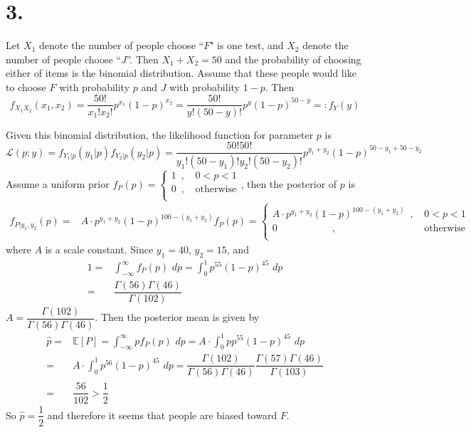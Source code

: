 \documentclass[a4paper,12pt,titlepage]{article}
\begin{document}
\section*{3.}
Let $X_1$ denote the number of people choose ``$F$" is one test, and $X_2$ denote the number of people choose ``$J$''. Then $X_1+X_2=50$ and the probability of choosing either of items is the binomial distribution.  Assume that these people would like to choose $F$ with probability $p$ and $J$ with probability $1-p$. Then
$$f_{X_1X_2}(x_1, x_2)=\dfrac{50!}{x_1!x_2!}p^{x_1}(1-p)^{x_2}=\dfrac{50!}{y!(50-y)!}p^y(1-p)^{50-y}=:f_Y(y)$$

Given this binomial distribution, the likelihood function for parameter $p$ is
$$\mathcal{L}(p;y)=f_{Y_1|p}(y_1|p)f_{Y_2|p}(y_2|p)=\dfrac{50!50!}{y_1!(50-y_1)!y_2!(50-y_2)!}p^{y_1+y_2}(1-p)^{50-y_1+50-y_2}$$
Assume a uniform prior $f_P(p)=\left\{
\begin{aligned}
1\,\,\,,\,&0<p<1\\
0\,\,\,,\,&\text{otherwise}\\
\end{aligned}
\right.$, then the posterior of $p$ is
\begin{align*}
    f_{P|y_1,y_2}(p)=&A\cdot p^{y_1+y_2}(1-p)^{100-(y_1+y_2)}f_{P}(p)=\left\{
\begin{aligned}
A\cdot p^{y_1+y_2}(1-p)^{100-(y_1+y_2)}\,\,\,,\,&0<p<1\\
0\quad\quad\quad\quad\quad\,\,\,,\,&\text{otherwise}\\
\end{aligned}
\right.
\end{align*}
where $A$ is a scale constant. Since $y_1=40$, $y_2=15$, and
\begin{align*}
    1=&\int_{-\infty}^{\infty}f_{P}(p)\,\,dp=\int_{0}^{1}p^{55}(1-p)^{45}\,\,dp\\
    =&\dfrac{\Gamma(56)\Gamma(46)}{\Gamma(102)}
\end{align*}
$A=\dfrac{\Gamma(102)}{\Gamma(56)\Gamma(46)}$. Then the posterior mean is given by
\begin{align*}
    \hat{p}=&\mathbb{E}[P]=\int_{-\infty}^{\infty}pf_{P}(p)\,\,dp=A\cdot\int_{0}^{1}pp^{55}(1-p)^{45}\,\,dp\\
     =&A\cdot\int_{0}^{1}p^{56}(1-p)^{45}\,\,dp=\dfrac{\Gamma(102)}{\Gamma(56)\Gamma(46)}\dfrac{\Gamma(57)\Gamma(46)}{\Gamma(103)}\\
     =&\dfrac{56}{102}>\dfrac{1}{2}
\end{align*}
So $\hat{p}=\dfrac{1}{2}$ and therefore it seems that people are biased toward $F$.
\end{document}
